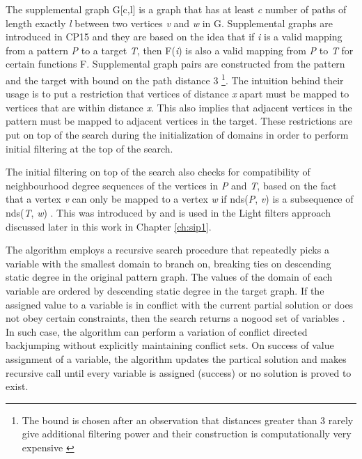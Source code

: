 \documentclass{l4proj}
\begin{document}
The supplemental graph G[c,l] is a graph that has at least \emph{c}
number of paths of length exactly \emph{l} between two vertices \emph{v} and \emph{w} in G. Supplemental graphs are introduced in CP15 and they are based on the idea that if \emph{i} is a valid mapping from a pattern \emph{P} to a target \emph{T}, then F(\emph{i}) is also a valid mapping from \emph{P} to \emph{T} for certain functions F. Supplemental graph pairs are constructed from the pattern and the target with bound on the path distance 3 \footnote{The bound is chosen after an observation that distances greater than 3 rarely give additional filtering power and their construction is computationally very expensive \cite{CP2015}}. The intuition behind their usage is to put a restriction that vertices of distance \emph{x} apart must be mapped to vertices that are within distance \emph{x}. This also implies that adjacent vertices in the pattern must be mapped to adjacent vertices in the target. These restrictions are put on top of the search during the initialization of domains in order to perform initial filtering at the top of the search.

The initial filtering on top of the search also checks for compatibility of neighbourhood degree sequences of the vertices in \emph{P} and \emph{T}, based on the fact that a vertex \emph{v} can only be mapped to a vertex \emph{w} if nds(\emph{P}, \emph{v}) is a subsequence of nds(\emph{T}, \emph{w}) \cite{Solnon:2010}. This was introduced by \cite{Solnon:2010} and is used in the Light filters approach discussed later in this work in Chapter \ref{ch:sip1}. 

The algorithm employs a recursive search procedure that repeatedly picks a variable with the smallest domain to branch on, breaking ties on descending static degree in the original pattern graph. The values of the domain of each variable are ordered by descending static degree in the target graph. If the assigned value to a variable is in conflict with the current partial solution or does not obey certain constraints, then the search returns a nogood set of variables \cite{CP2015}. In such case, the algorithm can perform a variation of conflict directed backjumping \cite{Prosser:1993} without explicitly maintaining conflict sets. On success of value assignment of a variable, the algorithm updates the partical solution and makes recursive call until every variable is assigned (success) or no solution is proved to exist. 
\end{document}
